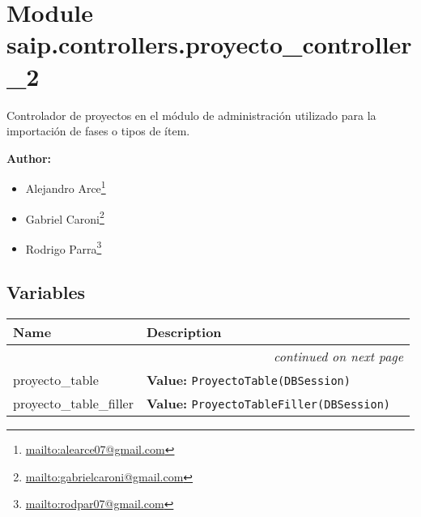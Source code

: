 %
%
%


\section{Module saip.controllers.proyecto\_controller\_2}

    \label{saip:controllers:proyecto_controller_2}
Controlador de proyectos en el módulo de administración utilizado para la 
importación de fases o tipos de ítem.

\textbf{Author:} \begin{itemize}
\setlength{\parskip}{0.6ex}
  \item Alejandro 
    Arce\footnote{\href{mailto:alearce07@gmail.com}{mailto:alearce07@gmail.com}}

  \item Gabriel 
    Caroni\footnote{\href{mailto:gabrielcaroni@gmail.com}{mailto:gabrielcaroni@gmail.com}}

  \item Rodrigo 
    Parra\footnote{\href{mailto:rodpar07@gmail.com}{mailto:rodpar07@gmail.com}}

\end{itemize}





  \subsection{Variables}

    \vspace{-1cm}
\hspace{\varindent}\begin{longtable}{|p{\varnamewidth}|p{\vardescrwidth}|l}
\cline{1-2}
\cline{1-2} \centering \textbf{Name} & \centering \textbf{Description}& \\
\cline{1-2}
\endhead\cline{1-2}\multicolumn{3}{r}{\small\textit{continued on next page}}\\\endfoot\cline{1-2}
\endlastfoot\raggedright p\-r\-o\-y\-e\-c\-t\-o\-\_\-t\-a\-b\-l\-e\- & \raggedright \textbf{Value:} 
{\tt ProyectoTable(DBSession)}&\\
\cline{1-2}
\raggedright p\-r\-o\-y\-e\-c\-t\-o\-\_\-t\-a\-b\-l\-e\-\_\-f\-i\-l\-l\-e\-r\- & \raggedright \textbf{Value:} 
{\tt ProyectoTableFiller(DBSession)}&\\
\cline{1-2}
\end{longtable}


